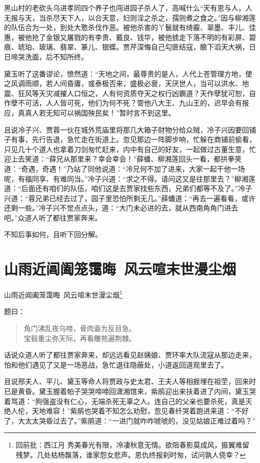 \documentclass[12pt,oneside]{book}
\newenvironment{shici}{%
\begin{verse}%
\centering\large\hspace{12pt}}%
{\end{verse}}
\begin{document}
黑山村的老砍头乌进孝同四个养子也闯进园子杀人了，高喊什么“天有恩与人，人无报与天，当杀尽天下人，以合天意，妇则淫之杀之，孺则煮之食之。”因与柳湘莲的队伍合为一处，到处大憝杀伐作恶。被他杀害的丫鬟就有绮霰、翠墨、丰儿、佳惠，被他抢了金银又屠戮的有李贵、戴良、钱华，被他掳走下落不明的有彩屏、碧痕、琥珀、玻璃、翡翠、篆儿、银蝶。贾芹深悔自己勾匪结寇，酿下滔天大祸，日日啼哭洗面，后不知所终。

黛玉听了这番谬论，愤然道：“天地之间，最尊贵的是人，人代上苍管理方地，使之风调雨顺，若人间昏庸，或泰极否来，盛极必衰，天厌世人，当可以洪水、地震、狂风等天灾减摧人口恒之，人有何资质夺天之权行凶霸道？天作孽犹可恕，自作孽不可活，人人皆可死，他们为何不死？管他八大王、九山王的，迟早会有报应，真真人若无知可以祸国殃民矣！”暂时言不到这里。

且说冷子兴、贾蓉一伙在城外荒庙里将那几大箱子财物分给众贼，冷子兴因要回铺子有事，先行告退，急忙走在街道上。忽见那边一阵脚步响，忙躲在商铺前偷看，只见几十个道人也拿着刀剑匆忙赶来，内中有自己的好友，一起做过古董生意，忙迎上去笑道：“薛兄从那里来？幸会幸会！”薛蟠、柳湘莲回头一看，都拱拳笑道：“奇遇，奇遇！”乃站了同他说道：“冷兄何不加了进来，大家一起干他一场呢，有福同享、有难同当。”冷子兴道：“求之不得。请问这又是往那里去？”柳湘莲道：“后面还有咱们的队伍，咱们这是去贾家找些东西，兄弟们都等不及了。”冷子兴道：“蓉兄弟已经去过了，园子里恐怕所剩无几。”薛蟠道：“再去一遍看看，或许还剩一些。”冷子兴不觉点点头，道：“大门未必进的去，就从西南角角门进去吧。”众道人听了都往贾家奔来。

不知后事如何，且听下回分解。


\chapter{山雨近阊阖笼霭晦~风云喧末世漫尘烟}
山雨近阊阖笼霭晦~风云喧末世漫尘烟\footnote{回前批：西江月 秀美春光有限，冷凄秋意无情。欲阻春影莫成风，振翼难留残梦。几处枯杨飘落，谁家怨女悲声。恩仇终报刹时匆，试问孰人侥幸？}

题曰：

\begin{shici}
角门沸乱夜乌啼，骨肉盍为反目急。\\
宝毂重尘弥天际，再看雕苑遍荆棘。
\end{shici}

话说众道人听了都往贾家奔来，却远远看见赵姨娘、贾环率大队流寇从那边走来，怕和他们遇见了又是一场恶战，急忙退往隐蔽处，小道返回道观里去了。

且说邢夫人、平儿、黛玉等命人将贾政与史太君、王夫人等相捱埋在祖茔，回来时已是黄昏。黛玉握着帕子哭哭啼啼回潇湘馆来，紫鹃迎出来扶着进了内间，黛玉哭着骂道：“狗强盗没有仁心，无端杀死无辜之人。连自己的父亲也要杀死，真是灭绝人伦，天地难容！”紫鹃也哭着不知怎么劝慰，忽见春纤哭着跑进来道：“不好了，大太太哭昏过去了。”紫鹃道：“一进门就咋咋唬唬的，没见姑娘正难过着吗？”
\end{document}
